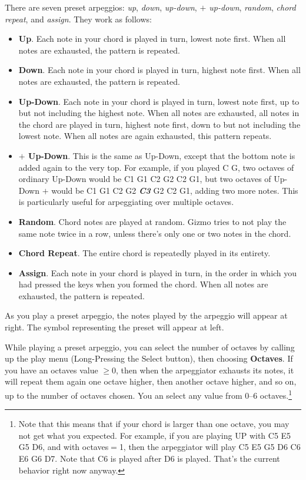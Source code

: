 \documentclass{article}
\begin{document}
There are seven preset arpeggios: {\it up}, {\it down}, {\it up-down}, {\it  \(+\) up-down}, {\it random}, {\it chord repeat}, and {\it assign}.  They work as follows:

\begin{itemize}
\item {\bf Up}.  Each note in your chord is played in turn, lowest note first.  When all notes are exhausted, the pattern is repeated.
\item {\bf Down}.  Each note in your chord is played in turn, highest note first.  When all notes are exhausted, the pattern is repeated.
\item {\bf Up-Down}.  Each note in your chord is played in turn, lowest note first, up to but not including the highest note.  When all notes are exhausted, all notes in the chord are played in turn, highest note first, down to but not including the lowest note.  When all notes are again exhausted, this pattern repeats.
\item {\bf  \(\bm{+}\) Up-Down}.  This is the same as Up-Down, except that the bottom note is added again to the very top.  For example, if you played C G, two octaves of ordinary Up-Down would be C1 G1 C2 G2 C2 G1, but two octaves of Up-Down \(+\) would be C1 G1 C2 G2 \textit{\textbf{C3}} G2 C2 G1, adding two more notes.  This is particularly useful for arpeggiating over multiple octaves.
\item {\bf Random}.  Chord notes are played at random.  Gizmo tries to not play the same note twice in a row, unless there's only one or two notes in the chord.
\item {\bf Chord Repeat}.  The entire chord is repeatedly played in its entirety.
\item {\bf Assign}. Each note in your chord is played in turn, in the order in which you had pressed the keys when you formed the chord.  When all notes are exhausted, the pattern is repeated.
\end{itemize}

As you play a preset arpeggio, the notes played by the arpeggio will appear at right.  The symbol representing the preset will appear at left.

While playing a preset arpeggio, you can select the number of octaves by calling up the play menu (Long-Pressing the Select button), then choosing {\bf Octaves}.  If you have an octaves value \(\geq 0\), then when the arpeggiator exhausts its notes, it will repeat them again one octave higher, then another octave higher, and so on, up to the number of octaves chosen. You an select any value from 0--6 octaves.\footnote{Note that this means that if your chord is larger than one octave, you may not get what you expected.  For example, if you are playing UP with C5 E5 G5 D6, and with octaves\(=\)1, then the arpeggiator will play C5 E5 G5 D6 C6 E6 G6 D7.  Note that C6 is played after D6 is played.  That's the current behavior right now anyway.}
\end{document}
